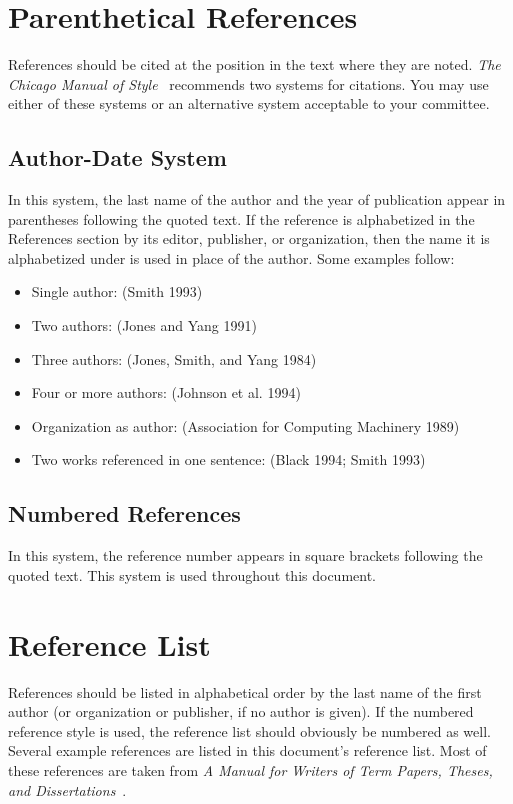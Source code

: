 \section{Parenthetical References}

References should be cited at the position in the text where they are noted.
\textit{The Chicago Manual of Style}~\cite{ChicagoManual} recommends two
systems for citations.  You may use either of these systems or an alternative
system acceptable to your committee.

\subsection{Author-Date System}

In this system, the last name of the author and the year of
publication appear in parentheses following the quoted text.  If the
reference is alphabetized in the References section by its editor,
publisher, or organization, then the name it is alphabetized under is
used in place of the author.  Some examples follow:
\begin{itemize}
 \item Single author: (Smith 1993)
 \item Two authors: (Jones and Yang 1991)
 \item Three authors: (Jones, Smith, and Yang 1984)
 \item Four or more authors: (Johnson et al. 1994)
 \item Organization as author: (Association for Computing Machinery 1989)
 \item Two works referenced in one sentence: (Black 1994; Smith 1993)
\end{itemize}

\subsection{Numbered References}

In this system, the reference number appears in square brackets following the
quoted text.  This system is used throughout this document.

\section{Reference List}

References should be listed in alphabetical order by the last name of the first
author (or organization or publisher, if no author is given).  If the numbered
reference style is used, the reference list should obviously be numbered as
well.  Several example references are listed in this document's reference list.
Most of these references are taken from \textit{A Manual for Writers of Term
Papers, Theses, and Dissertations}~\cite{Turabian}.
\fi

